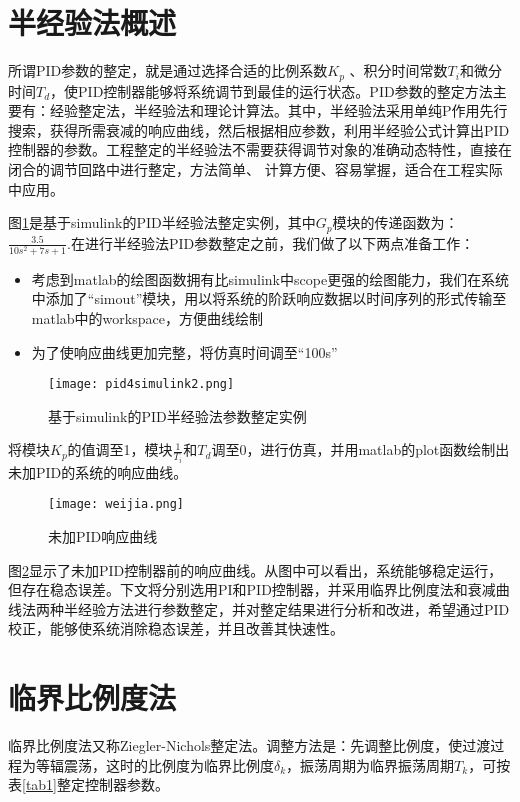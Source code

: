 \documentclass{WHUMaster}   %
\begin{document}
\section{半经验法概述}
所谓PID参数的整定，就是通过选择合适的比例系数$K_p$ 、积分时间常数$T_i$和微分时间$T_d$，使PID控制器能够将系统调节到最佳的运行状态。PID参数的整定方法主要有：经验整定法，半经验法和理论计算法。其中，半经验法采用单纯P作用先行搜索，获得所需衰减的响应曲线，然后根据相应参数，利用半经验公式计算出PID控制器的参数。工程整定的半经验法不需要获得调节对象的准确动态特性，直接在闭合的调节回路中进行整定，方法简单、 计算方便、容易掌握，适合在工程实际中应用。

图\ref{fig1}是基于simulink的PID半经验法整定实例，其中$G_p$模块的传递函数为：$\frac{3.5}{10s^2+7s+1}$.在进行半经验法PID参数整定之前，我们做了以下两点准备工作：
\begin{itemize}
	\item 考虑到matlab的绘图函数拥有比simulink中scope更强的绘图能力，我们在系统中添加了“simout”模块，用以将系统的阶跃响应数据以时间序列的形式传输至matlab中的workspace，方便曲线绘制
	\item 为了使响应曲线更加完整，将仿真时间调至“100s”
\end{itemize}
\begin{figure}[h]
	\small
	\centering
	\texttt{[image: pid4simulink2.png]}
	\caption{基于simulink的PID半经验法参数整定实例} \label{fig1}
\end{figure}

将模块$K_p$的值调至1，模块$\frac{1}{T_i}$和$T_d$调至0，进行仿真，并用matlab的plot函数绘制出未加PID的系统的响应曲线。

\begin{figure}[h]
	\small
	\centering
	\texttt{[image: weijia.png]}
	\caption{未加PID响应曲线} \label{fig2}
\end{figure}

图\ref{fig2}显示了未加PID控制器前的响应曲线。从图中可以看出，系统能够稳定运行，但存在稳态误差。下文将分别选用PI和PID控制器，并采用临界比例度法和衰减曲线法两种半经验方法进行参数整定，并对整定结果进行分析和改进，希望通过PID校正，能够使系统消除稳态误差，并且改善其快速性。
\section{临界比例度法}
临界比例度法又称Ziegler-Nichols整定法。调整方法是：先调整比例度，使过渡过程为等辐震荡，这时的比例度为临界比例度$\delta _k$，振荡周期为临界振荡周期$T_k$，可按表\ref{tab1}整定控制器参数。
\end{document}
